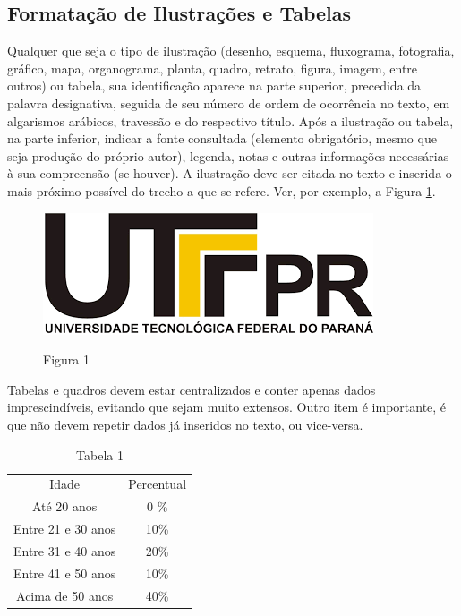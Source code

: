 \documentclass{modelo}
\begin{document}
\subsection{Formatação de Ilustrações e Tabelas} 

Qualquer que seja o tipo de ilustração (desenho, esquema, fluxograma, fotografia, gráfico, mapa, organograma, planta, quadro, retrato, figura, imagem, entre outros) ou tabela, sua identificação aparece na parte superior, precedida da palavra designativa, seguida de seu número de ordem de ocorrência no texto, em algarismos arábicos, travessão e do respectivo título. Após a ilustração ou tabela, na parte inferior, indicar a fonte consultada (elemento obrigatório, mesmo que seja produção do próprio autor), legenda, notas e outras informações necessárias à sua compreensão (se houver).
A ilustração deve ser citada no texto e inserida o mais próximo possível do trecho a que se refere. Ver, por exemplo, a Figura \ref{fig:fig1}. 
\begin{figure}[H]
    \centering 
        \caption{Figura 1}
    \includegraphics[scale=0.5]{figs/utf}
    \label{fig:fig1}
\end{figure}  
  
Tabelas e quadros devem estar centralizados e conter apenas dados imprescindíveis, evitando que sejam muito extensos. Outro item é importante, é que não devem repetir dados já inseridos no texto, ou vice-versa.  
 
\begin{table}[H]
    \centering  
    \caption{Tabela 1}
    \begin{tabular}{|c||c|}  
    \hline
    \cellcolor{teal}Idade     & \cellcolor{teal}Percentual  \\
    Até 20 anos     & 0 \% \\  
    Entre 21 e 30 anos & 10\% \\ 
    Entre 31 e 40 anos & 20\% \\ 
    Entre 41 e 50 anos & 10\% \\ 
    Acima de 50 anos & 40\% \\ 
    \hline
    \end{tabular}
    \label{tab:tab1}
\end{table} 
\end{document}
